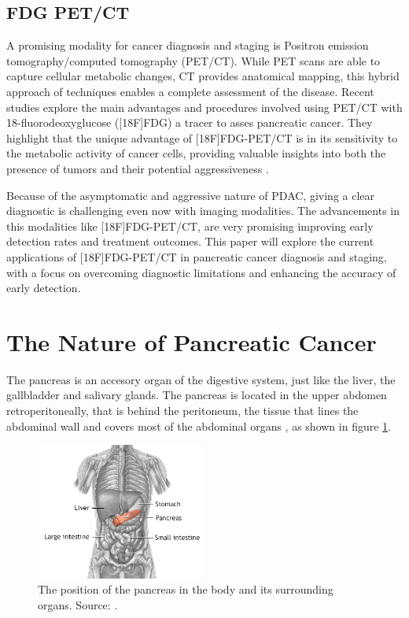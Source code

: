 \documentclass[11pt]{article} %
\begin{document}
\subsection{FDG PET/CT}

A promising modality for cancer diagnosis and staging is Positron emission tomography/computed tomography (PET/CT). While PET scans are able to capture cellular metabolic changes, CT provides anatomical mapping, this hybrid approach of techniques enables a complete assessment of the disease. Recent studies explore the main advantages and procedures involved using PET/CT with 18-fluorodeoxyglucose ([18F]FDG) a tracer to asses pancreatic cancer. They highlight that the unique advantage of [18F]FDG-PET/CT is in its sensitivity to the metabolic activity of cancer cells, providing valuable insights into both the presence of tumors and their potential aggressiveness \cite{Pu2021}.

Because of the asymptomatic and aggressive nature of PDAC, giving a clear diagnostic is challenging even now with imaging modalities. The advancements in this modalities like [18F]FDG-PET/CT, are very promising improving early detection rates and treatment outcomes. This paper will explore the current applications of [18F]FDG-PET/CT in pancreatic cancer diagnosis and staging, with a focus on overcoming diagnostic limitations and enhancing the accuracy of early detection.

    
\section{The Nature of Pancreatic Cancer}


The pancreas is an accesory organ of the digestive system, just like the liver, the gallbladder and salivary glands. The pancreas is located in the upper abdomen retroperitoneally, that is behind the peritoneum, the tissue that lines the abdominal wall and covers most of the abdominal organs \cite{talathi2023}, as shown in figure \ref{fig:pancreas_position}. 


\begin{figure}[h!]
	\centering
	\includegraphics[width=0.5\textwidth]{assets/8883.png}
	\caption{The position of the pancreas in the body and its surrounding organs. Source: \cite{mountsinai_pancreatic_position}.}
	\label{fig:pancreas_position}
\end{figure}
\end{document}
